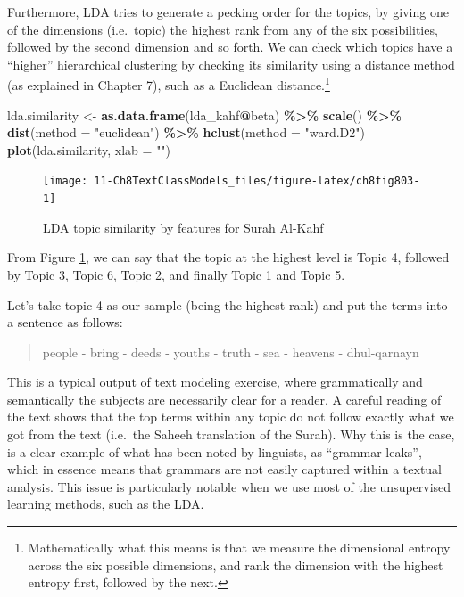 \documentclass[
]{article}
\newenvironment{Shaded}{\begin{snugshade}}{\end{snugshade}}
\newcommand{\AttributeTok}[1]{\textcolor[rgb]{0.13,0.29,0.53}{#1}}
\newcommand{\FunctionTok}[1]{\textcolor[rgb]{0.13,0.29,0.53}{\textbf{#1}}}
\newcommand{\NormalTok}[1]{#1}
\newcommand{\OtherTok}[1]{\textcolor[rgb]{0.56,0.35,0.01}{#1}}
\newcommand{\SpecialCharTok}[1]{\textcolor[rgb]{0.81,0.36,0.00}{\textbf{#1}}}
\newcommand{\StringTok}[1]{\textcolor[rgb]{0.31,0.60,0.02}{#1}}
\begin{document}
Furthermore, LDA tries to generate a pecking order for the topics, by giving one of the dimensions (i.e.~topic) the highest rank from any of the six possibilities, followed by the second dimension and so forth. We can check which topics have a ``higher'' hierarchical clustering by checking its similarity using a distance method (as explained in Chapter 7), such as a Euclidean distance.\footnote{Mathematically what this means is that we measure the dimensional entropy across the six possible dimensions, and rank the dimension with the highest entropy first, followed by the next.}

\begin{Shaded}
\begin{Highlighting}[]
\NormalTok{lda.similarity }\OtherTok{\textless{}{-}} \FunctionTok{as.data.frame}\NormalTok{(lda\_kahf}\SpecialCharTok{@}\NormalTok{beta) }\SpecialCharTok{\%\textgreater{}\%}
  \FunctionTok{scale}\NormalTok{() }\SpecialCharTok{\%\textgreater{}\%}
  \FunctionTok{dist}\NormalTok{(}\AttributeTok{method =} \StringTok{"euclidean"}\NormalTok{) }\SpecialCharTok{\%\textgreater{}\%}
  \FunctionTok{hclust}\NormalTok{(}\AttributeTok{method =} \StringTok{"ward.D2"}\NormalTok{)}
\FunctionTok{plot}\NormalTok{(lda.similarity, }\AttributeTok{xlab =} \StringTok{""}\NormalTok{)}
\end{Highlighting}
\end{Shaded}

\begin{figure}

{\centering \texttt{[image: 11-Ch8TextClassModels\_files/figure-latex/ch8fig803-1]} 

}

\caption{LDA topic similarity by features for Surah Al-Kahf}\label{fig:ch8fig803}
\end{figure}

From Figure \ref{fig:ch8fig803}, we can say that the topic at the highest level is Topic 4, followed by Topic 3, Topic 6, Topic 2, and finally Topic 1 and Topic 5.

Let's take topic 4 as our sample (being the highest rank) and put the terms into a sentence as follows:

\begin{quote}
people - bring - deeds - youths - truth - sea - heavens - dhul-qarnayn
\end{quote}

This is a typical output of text modeling exercise, where grammatically and semantically the subjects are necessarily clear for a reader. A careful reading of the text shows that the top terms within any topic do not follow exactly what we got from the text (i.e.~the Saheeh translation of the Surah). Why this is the case, is a clear example of what has been noted by linguists, as ``grammar leaks'', which in essence means that grammars are not easily captured within a textual analysis. This issue is particularly notable when we use most of the unsupervised learning methods, such as the LDA.
\end{document}
